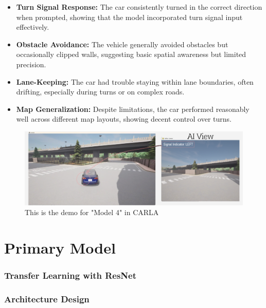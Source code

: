 \documentclass{article} %
\begin{document}
\begin{itemize}
  \item \textbf{Turn Signal Response:} The car consistently turned in the correct direction when prompted, showing that the model incorporated turn signal input effectively.

  \item \textbf{Obstacle Avoidance:} The vehicle generally avoided obstacles but occasionally clipped walls, suggesting basic spatial awareness but limited precision.

  \item \textbf{Lane-Keeping:} The car had trouble staying within lane boundaries, often drifting, especially during turns or on complex roads.

  \item \textbf{Map Generalization:} Despite limitations, the car performed reasonably well across different map layouts, showing decent control over turns.
\end{itemize}


\begin{figure}[H] %
    \centering
    \includegraphics[width=1.0\textwidth]{model4demo.png} %
    \caption{This is the demo for "Model 4" in CARLA}
    \label{fig:model4demo}
\end{figure}


\section{Primary Model}


\subsubsection{Transfer Learning with ResNet}

\subsubsection{Architecture Design}
\end{document}
